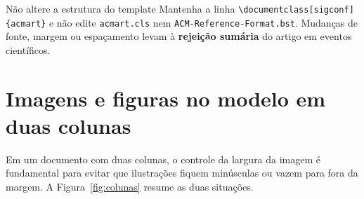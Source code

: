    \begin{atencao}{Não altere a estrutura do template}
        Mantenha a linha \texttt{\textbackslash documentclass[sigconf]\{acmart\}} e não edite \texttt{acmart.cls} nem \texttt{ACM-Reference-Format.bst}. Mudanças de fonte, margem ou espaçamento levam à \textbf{rejeição sumária} do artigo em eventos científicos.
    \end{atencao}

    \section{Imagens e figuras no modelo em duas colunas}\label{sec:imagens}

    Em um documento com duas colunas, o controle da largura da imagem é fundamental para evitar que ilustrações fiquem minúsculas ou vazem para fora da margem. A Figura~\ref{fig:colunas} resume as duas situações.

